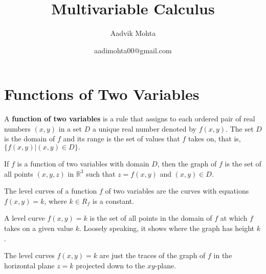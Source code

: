\documentclass{article}
\title{Multivariable Calculus}
\author{Aadvik Mohta}
\date{aadimohta00@gmail.com}
\begin{document}
\maketitle
\tableofcontents
\section{Functions of Two Variables}
\begin{definition}
    A \textbf{function of two variables} is a rule that assigns to each ordered pair of real numbers $(x,y)$ in a set $D$ a unique real number denoted by $f(x,y)$. The set $D$ is the domain of $f$ and its range is the set of values that $f$ takes on, that is, $\{f(x,y)|(x,y)\in D\}.$
\end{definition}
\begin{definition}
    If $f$ is a function of two variables with domain $D$, then the graph of $f$ is the set of all points $(x,y,z)$ in $\mathbb{R}^3$ such that $z=f(x,y)$ and $(x,y)\in D.$
\end{definition}
\begin{definition}
    The level curves of a function $f$ of two variables are the curves with equations $f(x,y)=k$, where $k\in R_f$ is a constant.
\end{definition}
\begin{remark}
    A level curve $f(x,y)=k$ is the set of all points in the domain of $f$ at which $f$ takes on a given value $k$. Loosely speaking, it shows where the graph has height $k$.
\end{remark}
\begin{remark}
    The level curves $f(x,y)=k$ are just the traces of the graph of $f$ in the horizontal plane $z=k$ projected down to the $xy$-plane.
\end{remark}
\newpage
\end{document}
